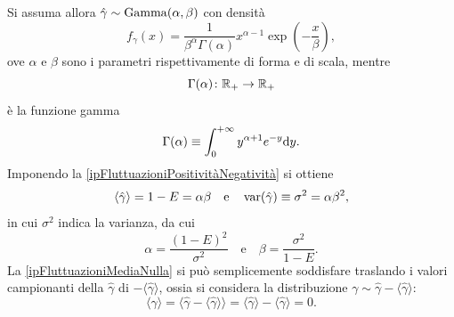                Si assuma allora \(\hat\gamma\sim\operatorname{Gamma}(\alpha,\beta)\) con densità
                \begin{equation*}
                    f_\gamma(x)=\frac1{\beta^\alpha\Gamma(\alpha)}x^{\alpha-1}
                    \exp\left(-\frac x\beta\right),
                \end{equation*}
                ove \(\alpha\) e \(\beta\) sono i parametri rispettivamente di forma e di scala, mentre
                \begin{equation*}
                    \Gamma(\alpha)\colon\mathbb R_+\to\mathbb R_+
                \end{equation*}
                è la funzione gamma
                \begin{equation*}
                    \Gamma(\alpha)\equiv\int_0^{+\infty}y^{\alpha+1}e^{-y}\mathrm{d} y.
                \end{equation*}
                Imponendo la \ref{ipFluttuazioniPositivitàNegatività} si ottiene
                \begin{equation*}
                    \langle\hat\gamma\rangle=1-E=\alpha\beta
                    \quad\text{e}\quad
                    \operatorname{var}(\hat\gamma)\equiv\sigma^2=\alpha\beta^2,
                \end{equation*}
                in cui \(\sigma^2\) indica la varianza, da cui
                \begin{equation*}
                    \alpha=\frac{(1-E)^2}{\sigma^2}
                    \quad\text{e}\quad
                    \beta=\frac{\sigma^2}{1-E}.
                \end{equation*}
                La \ref{ipFluttuazioniMediaNulla} si può semplicemente soddisfare traslando i valori campionanti della \(\hat\gamma\) di \(-\langle\hat\gamma\rangle\), ossia si considera la distribuzione \(\gamma\sim\hat\gamma-\langle\hat\gamma\rangle\):
                \begin{equation*}
                    \langle\gamma\rangle=
                    \langle\hat\gamma-\langle\hat\gamma\rangle\rangle=
                    \langle\hat\gamma\rangle-\langle\hat\gamma\rangle=0.
                \end{equation*}
